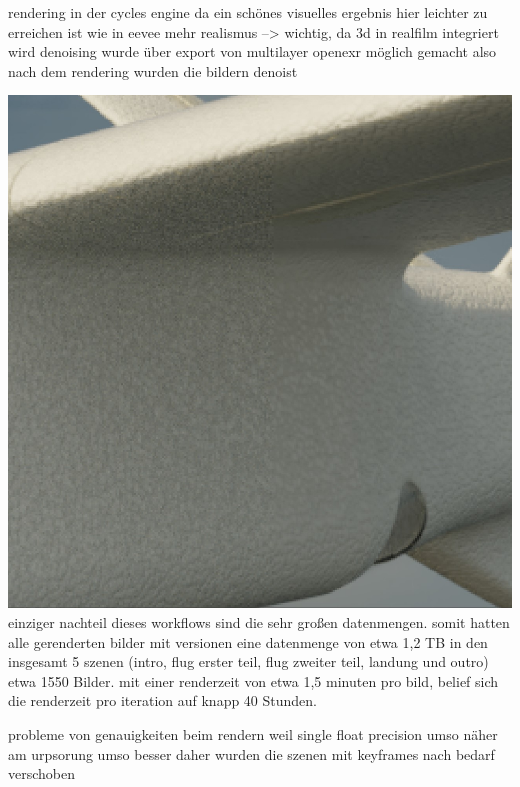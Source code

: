 rendering in der cycles engine
da ein schönes visuelles ergebnis hier leichter zu erreichen ist wie in eevee
mehr realismus --> wichtig, da 3d in realfilm integriert wird
denoising wurde über export von multilayer openexr möglich gemacht
also nach dem rendering wurden die bildern denoist

\includegraphics[width=\textwidth]{gfx/post/denoising.jpg}
einziger nachteil dieses workflows sind die sehr großen datenmengen. somit hatten alle gerenderten bilder mit versionen eine datenmenge von etwa 1,2 TB
in den insgesamt 5 szenen (intro, flug erster teil, flug zweiter teil, landung und outro) etwa 1550 Bilder.
mit einer renderzeit von etwa 1,5 minuten pro bild, belief sich die renderzeit pro iteration auf knapp 40 Stunden.

probleme von genauigkeiten beim rendern
weil single float precision
umso näher am urpsorung umso besser
daher wurden die szenen mit keyframes nach bedarf verschoben

